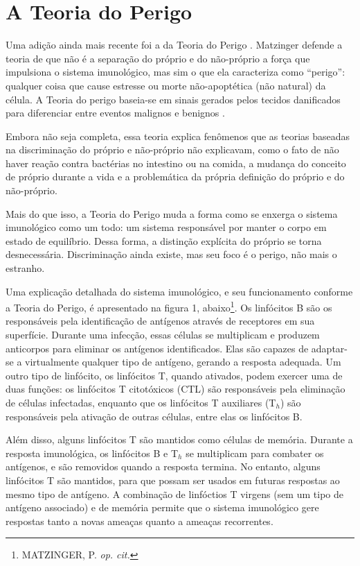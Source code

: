 \section{A Teoria do Perigo}

Uma adição ainda mais recente foi a da Teoria do Perigo \cite{Matzinger1994}. Matzinger defende a teoria de que não é a separação do próprio e do não-próprio a força que impulsiona o sistema imunológico, mas sim o que ela caracteriza como ``perigo'': qualquer coisa que cause estresse ou morte não-apoptética (não natural) da célula. A Teoria do perigo baseia-se em sinais gerados pelos tecidos danificados para diferenciar entre eventos malignos e benignos \cite{Cayzer2007}.

Embora não seja completa, essa teoria explica fenômenos que as teorias baseadas na discriminação do próprio e não-próprio não explicavam, como o fato de não haver reação contra bactérias no intestino ou na comida, a mudança do conceito de próprio durante a vida e a problemática da própria definição do próprio e do não-próprio.

Mais do que isso, a Teoria do Perigo muda a forma como se enxerga o sistema imunológico como um todo: um sistema responsável por manter o corpo em estado de equilíbrio. Dessa forma, a distinção explícita do próprio se torna desnecessária. Discriminação ainda existe, mas seu foco é o perigo, não mais o estranho.

Uma explicação detalhada do sistema imunológico, e seu funcionamento conforme a Teoria do Perigo, é apresentado na figura 1, abaixo\footnote{MATZINGER, P. \emph{op. cit.}}. Os linfócitos B são os responsáveis pela identificação de antígenos através de receptores em sua superfície. Durante uma infecção, essas células se multiplicam e produzem anticorpos para eliminar os antígenos identificados. Elas são capazes de adaptar-se a virtualmente qualquer tipo de antígeno, gerando a resposta adequada. Um outro tipo de linfócito, os linfócitos T, quando ativados, podem exercer uma de duas funções: os linfócitos T citotóxicos (CTL) são responsáveis pela eliminação de células infectadas, enquanto que os linfócitos T auxiliares (T$_{h}$) são responsáveis pela ativação de outras células, entre elas os linfócitos B.

Além disso, alguns linfócitos T são mantidos como células de memória. Durante a resposta imunológica, os linfócitos B e T$_{h}$ se multiplicam para combater os antígenos, e são removidos quando a resposta termina. No entanto, alguns linfócitos T são mantidos, para que possam ser usados em futuras respostas ao mesmo tipo de antígeno. A combinação de linfóctios T virgens (sem um tipo de antígeno associado) e de memória permite que o sistema imunológico gere respostas tanto a novas ameaças quanto a ameaças recorrentes.

